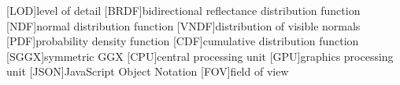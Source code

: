 [LOD]{level of detail}
[BRDF]{bidirectional reflectance distribution function}
[NDF]{normal distribution function}
[VNDF]{distribution of visible normals}
[PDF]{probability density function}
[CDF]{cumulative distribution function}
[SGGX]{symmetric GGX}
[CPU]{central processing unit}
[GPU]{graphics processing unit}
[JSON]{JavaScript Object Notation}
[FOV]{field of view}
